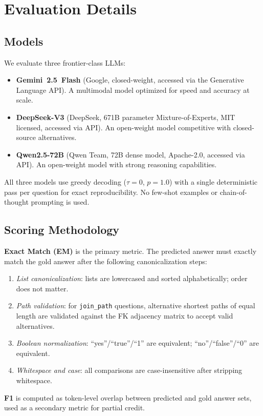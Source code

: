 
\section{Evaluation Details}
\label{app:decoding}

\subsection{Models}
We evaluate three frontier-class LLMs:
\begin{itemize}[nosep]
\item \textbf{Gemini~2.5~Flash} (Google, closed-weight, accessed via the
Generative Language API). A multimodal model optimized for speed and
accuracy at scale.
\item \textbf{DeepSeek-V3} (DeepSeek, 671B parameter Mixture-of-Experts,
MIT licensed, accessed via API). An open-weight model competitive with
closed-source alternatives.
\item \textbf{Qwen2.5-72B} (Qwen Team, 72B dense model,
Apache-2.0, accessed via API). An open-weight model with strong
reasoning capabilities.
\end{itemize}
All three models use greedy decoding ($\tau{=}0$, $p{=}1.0$) with a single
deterministic pass per question for exact reproducibility. No few-shot
examples or chain-of-thought prompting is used.

\subsection{Scoring Methodology}
\textbf{Exact Match (EM)} is the primary metric. The predicted answer must
exactly match the gold answer after the following canonicalization steps:
\begin{enumerate}[nosep]
\item \textit{List canonicalization}: lists are lowercased and sorted
alphabetically; order does not matter.
\item \textit{Path validation}: for \texttt{join\_path} questions,
alternative shortest paths of equal length are validated against the FK
adjacency matrix to accept valid alternatives.
\item \textit{Boolean normalization}: ``yes''/``true''/``1'' are equivalent;
``no''/``false''/``0'' are equivalent.
\item \textit{Whitespace and case}: all comparisons are
case-insensitive after stripping whitespace.
\end{enumerate}
\textbf{F1} is computed as token-level overlap between predicted and gold
answer sets, used as a secondary metric for partial credit.

